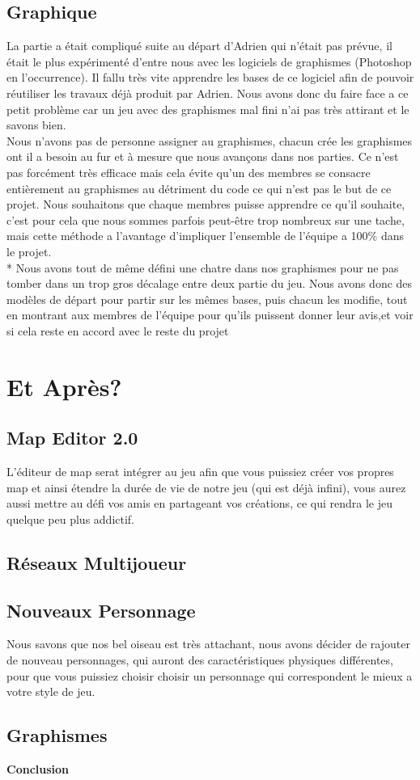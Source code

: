 \documentclass [11pt]{report}
\begin{document}
	\section{Graphique}
	La partie a était compliqué suite au départ d'Adrien qui n'était pas prévue, il était le plus expérimenté d'entre nous avec les logiciels de graphismes (Photoshop en l'occurrence). Il fallu très vite apprendre les bases de ce logiciel afin de pouvoir réutiliser les travaux déjà produit par Adrien. Nous avons donc du faire face a ce petit problème car un jeu avec des graphismes mal fini n'ai pas très attirant et le savons bien.\\
	\indent Nous n'avons pas de personne assigner au graphismes, chacun crée les graphismes ont il a besoin au fur et à mesure que nous avançons dans nos parties. Ce n'est pas forcément très efficace mais cela évite qu'un des membres se consacre entièrement au graphismes au détriment du code ce qui n'est pas le but de ce projet. Nous souhaitons que chaque membres puisse apprendre ce qu'il souhaite, c'est pour cela que nous sommes parfois peut-être trop nombreux sur une tache, mais cette méthode a l'avantage d'impliquer l'ensemble de l'équipe a 100\% dans le projet.\\*
	\indent Nous avons tout de même défini une chatre dans nos graphismes pour ne pas tomber dans un trop gros décalage entre deux partie du jeu. Nous avons donc des modèles de départ pour partir sur les mêmes bases, puis chacun les modifie, tout en montrant aux membres de l'équipe pour qu'ils puissent donner leur avis,et voir si cela reste en accord avec le reste du projet
	
	
\chapter{Et Après?}
	\section{Map Editor 2.0}
	L'éditeur de map serat intégrer au jeu afin que vous puissiez créer vos propres map et ainsi étendre la durée de vie de notre jeu (qui est déjà infini), vous aurez aussi mettre au défi vos amis en partageant vos créations, ce qui rendra le jeu quelque peu plus addictif.
	
	
	\section{Réseaux Multijoueur}



	\section{Nouveaux Personnage}
	Nous savons que nos bel oiseau est très attachant, nous avons décider de rajouter de nouveau personnages, qui auront des caractéristiques physiques différentes, pour que vous puissiez choisir choisir un personnage qui correspondent le mieux a votre style de jeu.
	
	
	\section{Graphismes}
\newpage
\textbf{{\huge Conclusion}}
\end{document}
